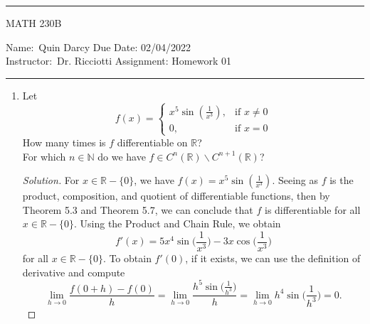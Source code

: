 \documentclass[12pt]{article}
\newenvironment{solution}
{\renewcommand\qedsymbol{$\blacksquare$}\begin{proof}[Solution]}
{\end{proof}}
\begin{document}
    \thispagestyle{empty}\hrule

    \begin{center}
        \vspace{.4cm} { \large MATH 230B}
    \end{center}
    {Name:\ Quin Darcy \hspace{\fill} Due Date: 02/04/2022   \\
    { Instructor:}\ Dr. Ricciotti \hspace{\fill} Assignment:
    Homework 01 \\ \hrule}

    \begin{enumerate}
        \item Let
            \begin{equation*}
                f(x)=\begin{cases}
                    x^5\sin(\frac{1}{x^3}), & \text{if $x\neq0$} \\
                    0, & \text{if $x=0$}
                \end{cases}
            \end{equation*}
            How many times is $f$ differentiable on $\mathbb{R}$?\\
            For which $n\in\mathbb{N}$ do we have 
            $f\in C^n(\mathbb{R})\backslash C^{n+1}(\mathbb{R})$?
            \begin{solution}
                For $x\in\mathbb{R}-\{0\}$, we have
                $f(x)=x^5\sin(\frac{1}{x^3})$. Seeing as $f$ is the product,
                composition, and quotient of differentiable functions, then by
                Theorem 5.3 and Theorem 5.7, we can conclude that $f$ is
                differentiable for all $x\in\mathbb{R}-\{0\}$. Using the
                Product and Chain Rule, we obtain
                \begin{equation*}
                    f'(x)=5x^4\sin\big(\frac{1}{x^3}\big)-3x\cos\big(\frac{1}{x^3}\big)
                \end{equation*}
                for all $x\in\mathbb{R}-\{0\}$. To obtain $f'(0)$, if it
                exists, we can use the definition of derivative and compute
                \begin{equation*}
                    \lim_{h\to
                    0}\frac{f(0+h)-f(0)}{h}=\lim_{h\to
                    0}\frac{h^5\sin\big(\frac{1}{h^3}\big)}{h}
                    =\lim_{h\to 0}h^4\sin\big(\frac{1}{h^3}\big)=0.
                \end{equation*}

\end{solution}
\end{enumerate}
\end{document}
